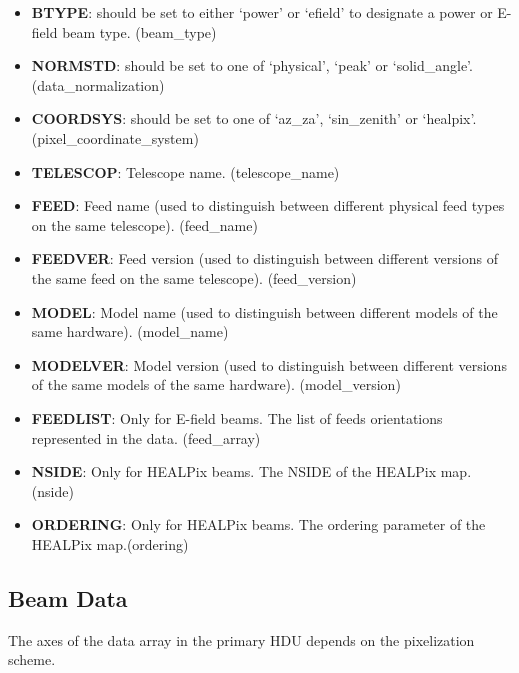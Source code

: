 \documentclass[11pt, oneside]{article}   	%
\begin{document}
\begin{itemize}
\item{\textbf{BTYPE}: should be set to either `power' or `efield' to designate a power or E-field beam type. (beam\_type)}
\item{\textbf{NORMSTD}: should be set to one of `physical', `peak' or `solid\_angle'. (data\_normalization)}
\item{\textbf{COORDSYS}: should be set to one of `az\_za', `sin\_zenith' or `healpix'. (pixel\_coordinate\_system)}
\item{\textbf{TELESCOP}: Telescope name. (telescope\_name)}
\item{\textbf{FEED}: Feed name (used to distinguish between different physical feed types on the same telescope). (feed\_name)}
\item{\textbf{FEEDVER}: Feed version (used to distinguish between different versions of the same feed on the same telescope). (feed\_version)}
\item{\textbf{MODEL}: Model name  (used to distinguish between different models of the same hardware). (model\_name)}
\item{\textbf{MODELVER}: Model version (used to distinguish between different versions of the same models of the same hardware). (model\_version)}
\item{\textbf{FEEDLIST}: Only for E-field beams. The list of feeds orientations represented in the data. (feed\_array)}
\item{\textbf{NSIDE}: Only for HEALPix beams. The NSIDE of the HEALPix map. (nside)}
\item{\textbf{ORDERING}: Only for HEALPix beams. The ordering parameter of the HEALPix map.(ordering)}
\end{itemize}

\subsection{Beam Data}
The axes of the data array in the primary HDU depends on the pixelization scheme.
\end{document}
